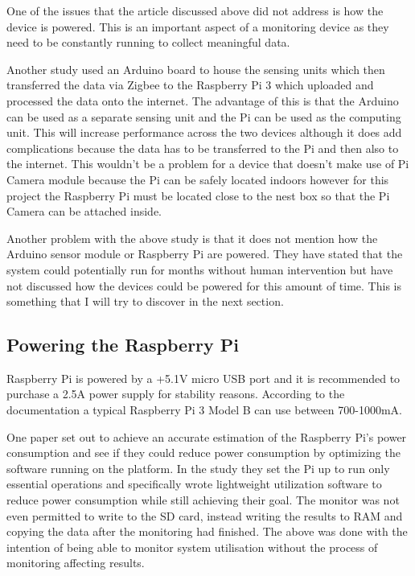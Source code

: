 \documentclass[10pt,a4paper]{article}
\begin{document}
One of the issues that the article discussed above did not address is how the device is powered. This is an important aspect of a monitoring device as they need to be constantly running to collect meaningful data.

Another study\cite{Sriyanka2017} used an Arduino board to house the sensing units which then transferred the data via Zigbee to the Raspberry Pi 3 which uploaded and processed the data onto the internet. The advantage of this is that the Arduino can be used as a separate sensing unit and the Pi can be used as the computing unit. This will increase performance across the two devices although it does add complications because the data has to be transferred to the Pi and then also to the internet. This wouldn't be a problem for a device that doesn't make use of Pi Camera module because the Pi can be safely located indoors however for this project the Raspberry Pi must be located close to the nest box so that the Pi Camera can be attached inside. 

Another problem with the above study is that it does not mention how the Arduino sensor module or Raspberry Pi are powered. They have stated that the system could potentially run for months without human intervention but have not discussed how the devices could be powered for this amount of time. This is something that I will try to discover in the next section.
\subsection{Powering the Raspberry Pi}
Raspberry Pi is powered by a +5.1V micro USB port and it is recommended to purchase a 2.5A power supply for stability reasons. According to the documentation a typical Raspberry Pi 3 Model B can use between 700-1000mA\cite{piDoc}. 

One paper set out to achieve an accurate estimation of the Raspberry Pi's power consumption and see if they could reduce power consumption by optimizing the software running on the platform\cite{Kaup2014}. In the study they set the Pi up to run only essential operations and specifically wrote lightweight utilization software to reduce power consumption while still achieving their goal. The monitor was not even permitted to write to the SD card, instead writing the results to RAM and copying the data after the monitoring had finished. The above was done with the intention of being able to monitor system utilisation without the process of monitoring affecting results. 
\end{document}
